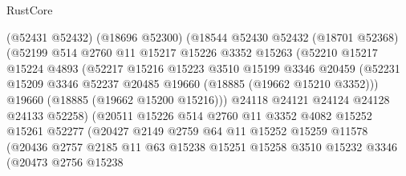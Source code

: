 \begin{lexlean}{RustCore}
\begin{coremodule}
                      (@52431 @52432)
                      (@18696 @52300)
                      (@18544
                        @52430
                        @52432
                        (@18701 @52368)
                        (@52199
                          @514
                          @2760
                          @11
                          @15217
                          @15226
                          @3352
                          @15263
                          (@52210
                            @15217
                            @15224
                            @4893
                            (@52217
                              @15216
                              @15223
                              @3510
                              @15199
                              @3346
                              @20459
                              (@52231
                                @15209
                                @3346
                                @52237
                                @20485
                                @19660
                                (@18885 (@19662 @15210 @3352)))
                              @19660
                              (@18885 (@19662 @15200 @15216)))
                            @24118
                            @24121
                            @24124
                            @24128
                            @24133
                            @52258)
                          (@20511
                            @15226
                            @514
                            @2760
                            @11
                            @3352
                            @4082
                            @15252
                            @15261
                            @52277
                            (@20427
                              @2149
                              @2759
                              @64
                              @11
                              @15252
                              @15259
                              @11578
                              (@20436
                                @2757
                                @2185
                                @11
                                @63
                                @15238
                                @15251
                                @15258
                                @3510
                                @15232
                                @3346
                                (@20473
                                  @2756
                                  @15238

\end{coremodule}
\end{lexlean}
